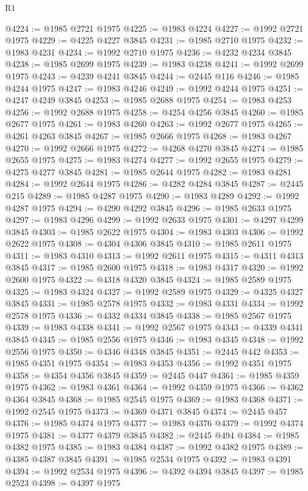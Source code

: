 \begin{lexlean}{R1}
\begin{coremodule}
@4224 := @1985 @2721 @1975
@4225 := @1983 @4224
@4227 := @1992 @2721 @1975
@4229 := @4225 @4227 @3845
@4231 := @1985 @2710 @1975
@4232 := @1983 @4231
@4234 := @1992 @2710 @1975
@4236 := @4232 @4234 @3845
@4238 := @1985 @2699 @1975
@4239 := @1983 @4238
@4241 := @1992 @2699 @1975
@4243 := @4239 @4241 @3845
@4244 := @2445 @116
@4246 := @1985 @4244 @1975
@4247 := @1983 @4246
@4249 := @1992 @4244 @1975
@4251 := @4247 @4249 @3845
@4253 := @1985 @2688 @1975
@4254 := @1983 @4253
@4256 := @1992 @2688 @1975
@4258 := @4254 @4256 @3845
@4260 := @1985 @2677 @1975
@4261 := @1983 @4260
@4263 := @1992 @2677 @1975
@4265 := @4261 @4263 @3845
@4267 := @1985 @2666 @1975
@4268 := @1983 @4267
@4270 := @1992 @2666 @1975
@4272 := @4268 @4270 @3845
@4274 := @1985 @2655 @1975
@4275 := @1983 @4274
@4277 := @1992 @2655 @1975
@4279 := @4275 @4277 @3845
@4281 := @1985 @2644 @1975
@4282 := @1983 @4281
@4284 := @1992 @2644 @1975
@4286 := @4282 @4284 @3845
@4287 := @2445 @215
@4289 := @1985 @4287 @1975
@4290 := @1983 @4289
@4292 := @1992 @4287 @1975
@4294 := @4290 @4292 @3845
@4296 := @1985 @2633 @1975
@4297 := @1983 @4296
@4299 := @1992 @2633 @1975
@4301 := @4297 @4299 @3845
@4303 := @1985 @2622 @1975
@4304 := @1983 @4303
@4306 := @1992 @2622 @1975
@4308 := @4304 @4306 @3845
@4310 := @1985 @2611 @1975
@4311 := @1983 @4310
@4313 := @1992 @2611 @1975
@4315 := @4311 @4313 @3845
@4317 := @1985 @2600 @1975
@4318 := @1983 @4317
@4320 := @1992 @2600 @1975
@4322 := @4318 @4320 @3845
@4324 := @1985 @2589 @1975
@4325 := @1983 @4324
@4327 := @1992 @2589 @1975
@4329 := @4325 @4327 @3845
@4331 := @1985 @2578 @1975
@4332 := @1983 @4331
@4334 := @1992 @2578 @1975
@4336 := @4332 @4334 @3845
@4338 := @1985 @2567 @1975
@4339 := @1983 @4338
@4341 := @1992 @2567 @1975
@4343 := @4339 @4341 @3845
@4345 := @1985 @2556 @1975
@4346 := @1983 @4345
@4348 := @1992 @2556 @1975
@4350 := @4346 @4348 @3845
@4351 := @2445 @442
@4353 := @1985 @4351 @1975
@4354 := @1983 @4353
@4356 := @1992 @4351 @1975
@4358 := @4354 @4356 @3845
@4359 := @2445 @447
@4361 := @1985 @4359 @1975
@4362 := @1983 @4361
@4364 := @1992 @4359 @1975
@4366 := @4362 @4364 @3845
@4368 := @1985 @2545 @1975
@4369 := @1983 @4368
@4371 := @1992 @2545 @1975
@4373 := @4369 @4371 @3845
@4374 := @2445 @457
@4376 := @1985 @4374 @1975
@4377 := @1983 @4376
@4379 := @1992 @4374 @1975
@4381 := @4377 @4379 @3845
@4382 := @2445 @494
@4384 := @1985 @4382 @1975
@4385 := @1983 @4384
@4387 := @1992 @4382 @1975
@4389 := @4385 @4387 @3845
@4391 := @1985 @2534 @1975
@4392 := @1983 @4391
@4394 := @1992 @2534 @1975
@4396 := @4392 @4394 @3845
@4397 := @1985 @2523
@4398 := @4397 @1975

\end{coremodule}
\end{lexlean}
